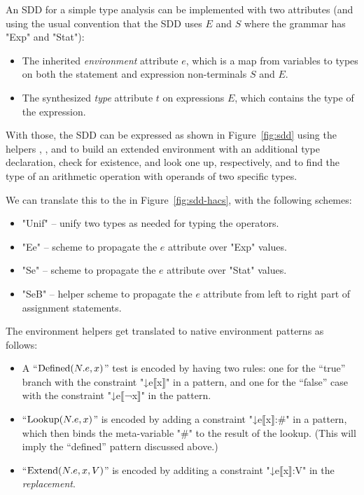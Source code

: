 \documentclass[11pt]{article} %
\begin{document}
\begin{example}\label{ex:sdd}
  An SDD for a simple type analysis can be implemented with two attributes (and using the usual
  convention that the SDD uses $E$ and $S$ where the \HAX grammar has "Exp" and "Stat"):
  \begin{itemize}

  \item The inherited \emph{environment} attribute $e$, which is a map from variables to types on
    both the statement and expression non-terminals $S$ and $E$.

  \item The synthesized \emph{type} attribute $t$ on expressions $E$, which contains the type of the
    expression.

  \end{itemize}
  With those, the SDD can be expressed as shown in Figure~\ref{fig:sdd} using the helpers
  , , and  to build an extended environment with an additional
  type declaration, check for existence, and look one up, respectively, and  to find the
  type of an arithmetic operation with operands of two specific types.

  We can translate this to the \HAX in Figure~\ref{fig:sdd-hacs}, with the following schemes:
  \begin{itemize}

  \item "Unif" -- unify two types as needed for typing the operators.

  \item "Ee" -- scheme to propagate the $e$ attribute over "Exp" values.

  \item "Se" -- scheme to propagate the $e$ attribute over "Stat" values.

  \item "SeB" -- helper scheme to propagate the $e$ attribute from left to right part of assignment
    statements.
    
  \end{itemize}
  The environment helpers get translated to native \HAX environment patterns as follows:
  \begin{itemize}

  \item A ``$\operatorname{Defined}(N.e, x)$'' test is encoded by having two rules: one for the ``true''
    branch with the constraint "↓e{⟦x⟧}" in a pattern, and one for the ``false'' case with the
    constraint "↓e{⟦¬x⟧}" in the pattern.

  \item ``$\operatorname{Lookup}(N.e, x)$'' is encoded by adding a constraint "↓e{⟦x⟧:#}" in a pattern, which
    then binds the meta-variable "#" to the result of the lookup. (This will imply the ``defined''
    pattern discussed above.)

  \item ``$\operatorname{Extend}(N.e, x, V)$'' is encoded by additing a constraint "↓e{⟦x⟧:V}" in the
    \emph{replacement}.

  \end{itemize}
\end{example}
\end{document}
